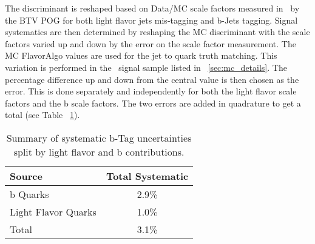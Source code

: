 The discriminant is reshaped based on Data/MC scale factors measured in~\cite{BTV11003} by the BTV POG for both light flavor jets mis-tagging and b-Jets tagging. Signal systematics are then determined by reshaping the MC discriminant with the scale factors varied up and down by the error on the scale factor measurement. The MC FlavorAlgo values are used for the jet to quark truth matching. This variation is performed in the \ttZ \ signal sample listed in ~\ref{sec:mc_details}. The percentage difference up and down from the central value is then chosen as the error. This is done separately and independently for both the light flavor scale factors and the b scale factors. The two errors are added in quadrature to get a total (see Table ~\ref{tab:systbTag}).


\begin{table}[h]
\begin{center}
\caption{\small\label{tab:systbTag} Summary of systematic b-Tag uncertainties split by light flavor and b contributions.}
\begin{tabular}{lc}\hline
Source & Total Systematic \\ \hline
b Quarks & 2.9\% \\
Light Flavor Quarks & 1.0\% \\ \hline
Total & 3.1\% \\
\hline
\end{tabular}
\end{center}
\end{table}

